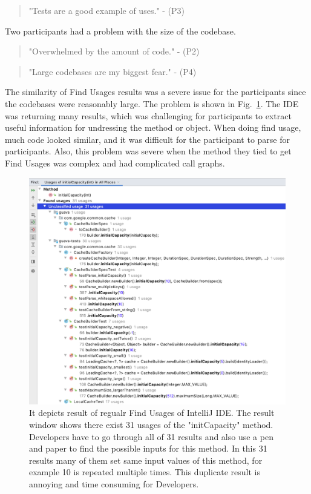 \documentclass[conference]{IEEEtran}
\begin{document}
\begin{quote} "Tests are a good example of uses." - (P3)\end{quote}
Two participants had a problem with the size of the codebase.
\begin{quote}"Overwhelmed by the amount of code." - (P2) \end{quote}
\begin{quote}"Large codebases are my biggest fear." - (P4) \end{quote}
The similarity of Find Usages results was a severe issue for the participants since the codebases were reasonably large. The problem is shown in Fig.~\ref{fig:usege}. The IDE was returning many results, which was challenging for participants to extract useful information for undressing the method or object. When doing find usage, much code looked similar, and it was difficult for the participant to parse for participants. Also, this problem was severe when the method they tied to get Find Usages was complex and had complicated call graphs.

\begin{figure}
    \centering
    \includegraphics [width=\columnwidth,keepaspectratio, clip]{figures/challenge}
    \caption{It depicts result of regualr Find Usages of IntelliJ IDE. The result window shows there exist 31 usages of the "initCapacity" method. Developers have to go through all of 31 results and also use a pen and paper to find the possible inputs for this method. In this 31 results many of them set same input values of this method, for example 10 is repeated multiple times. This duplicate result is annoying and time consuming for Developers. 
}
\label{fig:usege}
\end{figure}
\end{document}
